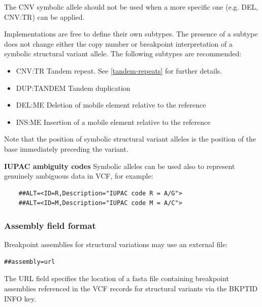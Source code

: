 \documentclass[8pt]{article}
\begin{document}
The CNV symbolic allele should not be used when a more specific one (e.g. DEL, CNV:TR) can be applied.

Implementations are free to define their own subtypes.
The presence of a subtype does not change either the copy number or breakpoint interpretation of a symbolic structural variant allele.
The following subtypes are recommended:
\begin{itemize}
  \item CNV:TR Tandem repeat. See \ref{tandem-repeats} for further details.
  \item DUP:TANDEM Tandem duplication
  \item DEL:ME Deletion of mobile element relative to the reference
  \item INS:ME Insertion of a mobile element relative to the reference
\end{itemize}

Note that the position of symbolic structural variant alleles is the position of the base immediately preceding the variant.

\bigskip

\noindent \textbf{IUPAC ambiguity codes} \newline
Symbolic alleles can be used also to represent genuinely ambiguous data in VCF, for example:
\begin{verbatim}
    ##ALT=<ID=R,Description="IUPAC code R = A/G">
    ##ALT=<ID=M,Description="IUPAC code M = A/C">
\end{verbatim}

\subsubsection{Assembly field format}
Breakpoint assemblies for structural variations may use an external file:
\begin{verbatim}
##assembly=url
\end{verbatim}

The URL field specifies the location of a fasta file containing breakpoint assemblies referenced in the VCF records for structural variants via the BKPTID INFO key.
\end{document}
